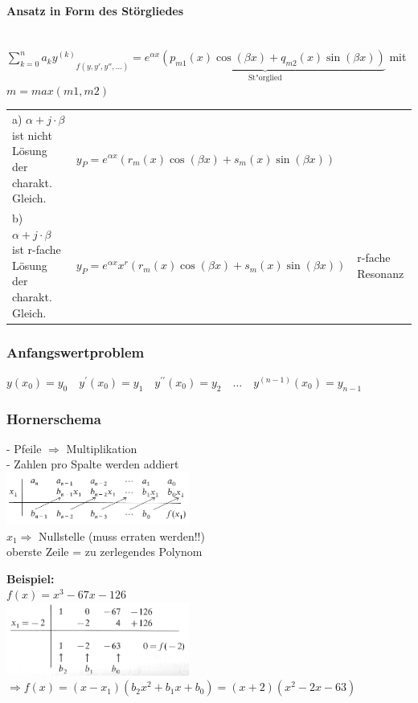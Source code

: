 \paragraph{Ansatz in Form des Störgliedes\\ \\}
${\sum_{k=0}^n a_k y^{(k)}}_{f(y,y',y'',\ldots)} = \underbrace{e^{\alpha x} (p_{m1}(x) \cos (\beta x) + q_{m2}(x) \sin (\beta x))}_{\text{St"orglied}}$
\hspace{1cm} mit $m = max(m1, m2)$\\

\begin{tabular}{lll}
a) $\alpha + j \cdot \beta$ ist nicht Lösung der charakt. Gleich. & 
$y_P = e^{\alpha x}(r_m(x)\cos(\beta x) + s_m(x) \sin(\beta x))$\\
b) $\alpha + j \cdot \beta$ ist r-fache Lösung der charakt. Gleich. & 
$y_P = e^{\alpha x} x^r (r_m(x) \cos(\beta x) + s_m(x) \sin(\beta x))$ & 
r-fache Resonanz
\end{tabular}

\subsubsection{Anfangswertproblem}
$y\left(x_{0}\right)=y_{0} \quad y^{\prime}\left(x_{0}\right)=y_{1} \quad y^{\prime \prime}\left(x_{0}\right)=y_{2} \quad \ldots \quad y^{(n-1)}\left(x_{0}\right)=y_{n-1}$


\subsubsection{Hornerschema}
\begin{minipage}[t]{9cm}
- Pfeile $\Rightarrow$ Multiplikation\\
- Zahlen pro Spalte werden addiert\\
\includegraphics[width=6cm]{./bilder/Hornerschema_1.png}\\
$x_1 \Rightarrow$ Nullstelle (muss erraten werden!!)\\
oberste Zeile = zu zerlegendes Polynom
\end{minipage}
\begin{minipage}[t]{9cm}
\textbf{Beispiel:}\\
$f(x) = x^3-67x-126$\\
\includegraphics[width=6cm]{./bilder/Hornerschema_2.png}\\
$\Rightarrow f(x) = (x-x_1)(b_2x^2 + b_1x + b_0) = (x+2)(x^2-2x-63)$  
\end{minipage}

